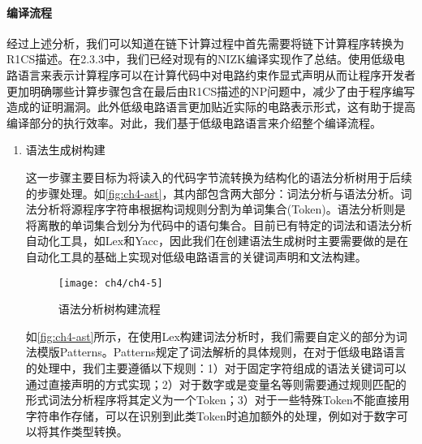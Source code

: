 \paragraph{编译流程} 经过上述分析，我们可以知道在链下计算过程中首先需要将链下计算程序转换为R1CS描述。在2.3.3中，我们已经对现有的NIZK编译实现作了总结。使用低级电路语言来表示计算程序可以在计算代码中对电路约束作显式声明从而让程序开发者更加明确哪些计算步骤包含在最后由R1CS描述的NP问题中，减少了由于程序编写造成的证明漏洞。此外低级电路语言更加贴近实际的电路表示形式，这有助于提高编译部分的执行效率。对此，我们基于低级电路语言来介绍整个编译流程。
\begin{enumerate}
    \item 语法生成树构建
    
    这一步骤主要目标为将读入的代码字节流转换为结构化的语法分析树用于后续的步骤处理。如\autoref{fig:ch4-ast}，其内部包含两大部分：词法分析与语法分析。词法分析将源程序字符串根据构词规则分割为单词集合(Token)。语法分析则是将离散的单词集合划分为代码中的语句集合。目前已有特定的词法和语法分析自动化工具，如Lex和Yacc，因此我们在创建语法生成树时主要需要做的是在自动化工具的基础上实现对低级电路语言的关键词声明和文法构建。
    \begin{figure}[htbp]
        \centering
        \texttt{[image: ch4/ch4-5]}
        \caption{\label{fig:ch4-ast}语法分析树构建流程\cite{ast}}
    \end{figure}

    如\autoref{fig:ch4-ast}所示，在使用Lex构建词法分析时，我们需要自定义的部分为词法模版Patterns。Patterns规定了词法解析的具体规则，在对于低级电路语言的处理中，我们主要遵循以下规则：1）对于固定字符组成的语法关键词可以通过直接声明的方式实现；2）对于数字或是变量名等则需要通过规则匹配的形式词法分析程序将其定义为一个Token；3）对于一些特殊Token不能直接用字符串作存储，可以在识别到此类Token时追加额外的处理，例如对于数字可以将其作类型转换。


\end{enumerate}
